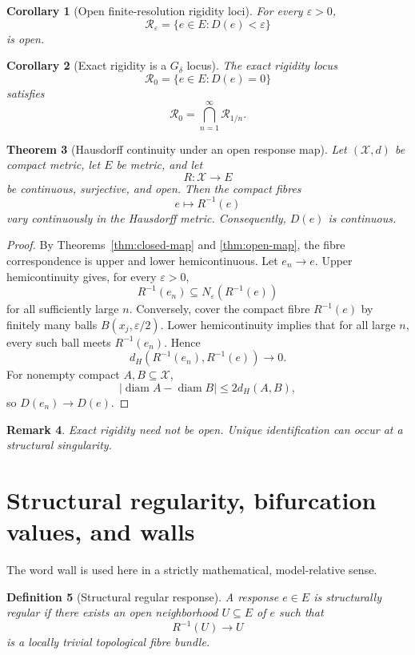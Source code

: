 \documentclass[11pt]{article}
\newtheorem{definition}{Definition}[section]
\newtheorem{theorem}[definition]{Theorem}
\newtheorem{corollary}[definition]{Corollary}
\newtheorem{remark}[definition]{Remark}
\newcommand{\X}{\mathcal X}
\begin{document}
\begin{corollary}[Open finite-resolution rigidity loci]
For every \(\varepsilon>0\),
\[
\mathcal R_\varepsilon
=
\{e\in E:D(e)<\varepsilon\}
\]
is open.
\end{corollary}

\begin{corollary}[Exact rigidity is a \(G_\delta\) locus]
The exact rigidity locus
\[
\mathcal R_0
=
\{e\in E:D(e)=0\}
\]
satisfies
\[
\mathcal R_0
=
\bigcap_{n=1}^{\infty}\mathcal R_{1/n}.
\]
\end{corollary}

\begin{theorem}[Hausdorff continuity under an open response map]
\label{thm:hausdorff-cont}
Let \((\X,d)\) be compact metric, let \(E\) be metric, and let
\[
R:\X\to E
\]
be continuous, surjective, and open. Then the compact fibres
\[
e\longmapsto R^{-1}(e)
\]
vary continuously in the Hausdorff metric. Consequently, \(D(e)\) is
continuous.
\end{theorem}

\begin{proof}
By Theorems~\ref{thm:closed-map} and \ref{thm:open-map}, the fibre
correspondence is upper and lower hemicontinuous. Let \(e_n\to e\).
Upper hemicontinuity gives, for every \(\varepsilon>0\),
\[
R^{-1}(e_n)\subseteq N_\varepsilon(R^{-1}(e))
\]
for all sufficiently large \(n\). Conversely, cover the compact fibre
\(R^{-1}(e)\) by finitely many balls \(B(x_j,\varepsilon/2)\). Lower
hemicontinuity implies that for all large \(n\), every such ball meets
\(R^{-1}(e_n)\). Hence
\[
d_H(R^{-1}(e_n),R^{-1}(e))\to0.
\]
For nonempty compact \(A,B\subseteq\X\),
\[
|\operatorname{diam}A-\operatorname{diam}B|\le2d_H(A,B),
\]
so \(D(e_n)\to D(e)\).
\end{proof}
\begin{remark}
Exact rigidity need not be open. Unique identification can occur at a
structural singularity.
\end{remark}

\section{Structural regularity, bifurcation values, and walls}

The word wall is used here in a strictly mathematical, model-relative sense.

\begin{definition}[Structural regular response]
A response \(e\in E\) is structurally regular if there exists an open
neighborhood \(U\subseteq E\) of \(e\) such that
\[
R^{-1}(U)\to U
\]
is a locally trivial topological fibre bundle.
\end{definition}
\end{document}
